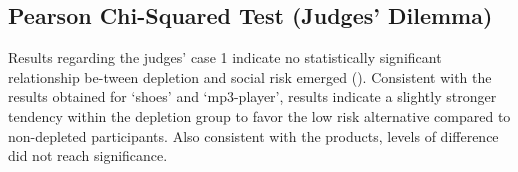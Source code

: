 \subsection{Pearson Chi-Squared Test (Judges’ Dilemma)}\label{sec:pearson_chi_judges}
Results regarding the judges’ case 1 indicate no statistically significant relationship be-tween depletion and social risk emerged (). Consistent with the results obtained for ‘shoes’ and ‘mp3-player’, results indicate a slightly stronger tendency within the depletion group to favor the low risk alternative compared to non-depleted participants. Also consistent with the products, levels of difference did not reach significance.

\begin{figure}
\begin{floatrow}
\capbfigbox{%

}
\end{floatrow}
\end{figure}

